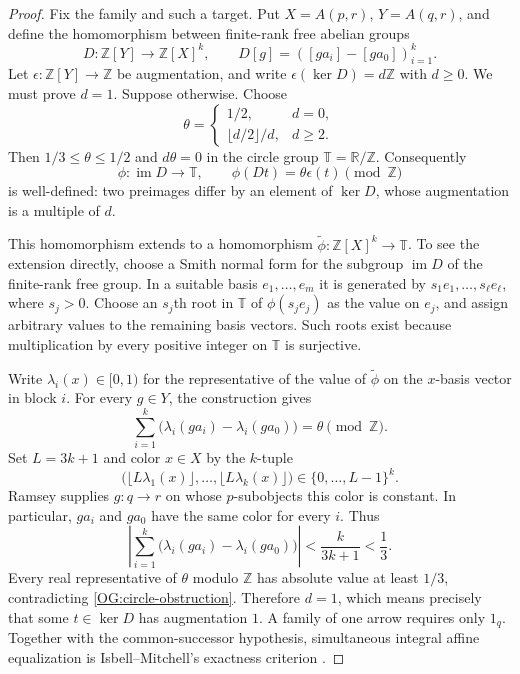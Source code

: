 \begin{proof}
Fix the family and such a target. Put $X=A(p,r)$, $Y=A(q,r)$, and
define the homomorphism between finite-rank free abelian groups
\[
 D:\mathbb Z[Y]\longrightarrow\mathbb Z[X]^k,
 \qquad D[g]=([ga_i]-[ga_0])_{i=1}^k.
\]
Let $\epsilon:\mathbb Z[Y]\to\mathbb Z$ be augmentation, and write
$\epsilon(\ker D)=d\mathbb Z$ with $d\geq0$. We must prove $d=1$.
Suppose otherwise. Choose
\[
 \theta=\begin{cases}
  1/2,&d=0,\\
  \lfloor d/2\rfloor/d,&d\geq2.
 \end{cases}
\]
Then $1/3\leq\theta\leq1/2$ and $d\theta=0$ in the circle group
$\mathbb T=\mathbb R/\mathbb Z$. Consequently
\[
 \phi:\operatorname{im}D\longrightarrow\mathbb T,
 \qquad \phi(Dt)=\theta\epsilon(t)\pmod{\mathbb Z}
\]
is well-defined: two preimages differ by an element of $\ker D$,
whose augmentation is a multiple of $d$.

This homomorphism extends to a homomorphism
$\widetilde\phi:\mathbb Z[X]^k\to\mathbb T$. To see the extension
directly, choose a Smith normal form for the subgroup
$\operatorname{im}D$ of the finite-rank free group. In a suitable basis
$e_1,\ldots,e_m$ it is generated by $s_1e_1,\ldots,s_\ell e_\ell$,
where $s_j>0$. Choose an $s_j$th root in $\mathbb T$ of
$\phi(s_je_j)$ as the value on $e_j$, and assign arbitrary values to
the remaining basis vectors. Such roots exist because multiplication
by every positive integer on $\mathbb T$ is surjective.

Write $\lambda_i(x)\in[0,1)$ for the representative of the value
of $\widetilde\phi$ on the $x$-basis vector in block $i$. For every
$g\in Y$, the construction gives
\begin{equation}\label{OG:circle-obstruction}
 \sum_{i=1}^k\bigl(\lambda_i(ga_i)-\lambda_i(ga_0)\bigr)
       =\theta\pmod{\mathbb Z}.
\end{equation}
Set $L=3k+1$ and color $x\in X$ by the $k$-tuple
\[
 \bigl(\lfloor L\lambda_1(x)\rfloor,\ldots,
       \lfloor L\lambda_k(x)\rfloor\bigr)\in\{0,\ldots,L-1\}^k.
\]
Ramsey supplies $g:q\to r$ on whose $p$-subobjects this color is
constant. In particular, $ga_i$ and $ga_0$ have the same color for
every $i$. Thus
\[
 \left|\sum_{i=1}^k
   \bigl(\lambda_i(ga_i)-\lambda_i(ga_0)\bigr)\right|
 <\frac{k}{3k+1}<\frac13.
\]
Every real representative of $\theta$ modulo $\mathbb Z$ has absolute
value at least $1/3$, contradicting \eqref{OG:circle-obstruction}.
Therefore $d=1$, which means precisely that some $t\in\ker D$ has
augmentation $1$. A family of one arrow requires only $1_q$.
Together with the common-successor hypothesis, simultaneous integral
affine equalization is Isbell--Mitchell's exactness criterion
\cite[Theorem~3.1 and Proposition~3.3]{IsbellMitchell1976}.
\end{proof}

